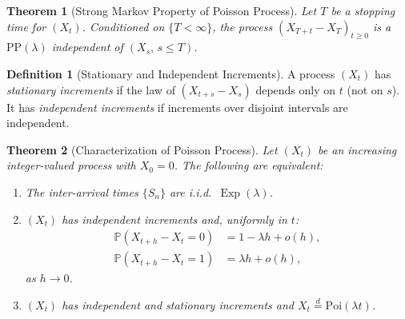 \documentclass[12pt, a4paper]{article}
\theoremstyle{definition}
\newtheorem{definition}{Definition}[section]
\theoremstyle{plain}
\newtheorem{theorem}{Theorem}[section]
\DeclareMathOperator{\Exp}{Exp}
\newcommand{\PP}{\mathbb{P}}
\begin{document}
\begin{theorem}[Strong Markov Property of Poisson Process]
Let $T$ be a stopping time for $(X_t)$. Conditioned on $\{T<\infty\}$, the process $(X_{T+t}-X_T)_{t\ge 0}$ is a $\text{PP}(\lambda)$ independent of $(X_s,\,s\le T)$.
\end{theorem}

\begin{definition}[Stationary and Independent Increments]
A process $(X_t)$ has \emph{stationary increments} if the law of $(X_{t+s}-X_s)$ depends only on $t$ (not on $s$). It has \emph{independent increments} if increments over disjoint intervals are independent.
\end{definition}

\begin{theorem}[Characterization of Poisson Process]
Let $(X_t)$ be an increasing integer-valued process with $X_0=0$. The following are equivalent:
\begin{enumerate}[label=(\roman*)]
  \item The inter-arrival times $\{S_n\}$ are i.i.d.\ $\Exp(\lambda)$.
  \item $(X_t)$ has independent increments and, uniformly in $t$:
  \begin{align*}
    \PP(X_{t+h}-X_t=0) &= 1-\lambda h+o(h),\\
    \PP(X_{t+h}-X_t=1) &= \lambda h+o(h),
  \end{align*}
  as $h\to 0$.
  \item $(X_t)$ has independent and stationary increments and $X_t\overset{d}{=}\text{Poi}(\lambda t)$.
\end{enumerate}
\end{theorem}
\end{document}
